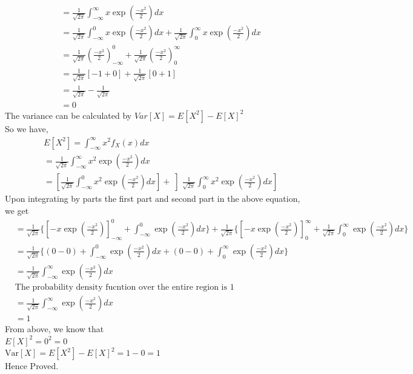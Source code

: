 \documentclass[journal,12pt,twocolumn]{IEEEtran}
\renewcommand\thesection{\arabic{section}}
\begin{document}
\begin{enumerate}[label=\thesection.\arabic*
,ref=\thesection.\theenumi]
\begin{align*}
& =\frac{1}{\sqrt{2\pi}}\int_{-\infty}^{\infty}x\exp\left(\frac{-x^2}{2}\right)dx
\\
& =\frac{1}{\sqrt{2\pi}}\int_{-\infty}^{0} x\exp\left(\frac{-x^2}{2}\right)dx + \frac{1}{\sqrt{2\pi}}\int_{0}^{\infty} x\exp\left(\frac{-x^2}{2}\right)dx
\\
& =\frac{1}{\sqrt{2\pi}}\left(\frac{-x^2}{2}\right)_{-\infty}^{0}+ \frac{1}{\sqrt{2\pi}}\left(\frac{-x^2}{2}\right)_{0}^{\infty}
\\
& =\frac{1}{\sqrt{2\pi}}[-1+0]+\frac{1}{\sqrt{2\pi}}[0+1]
\\
& =\frac{1}{\sqrt{2\pi}}-\frac{1}{\sqrt{2\pi}}
\\
& =0
\end{align*}
The variance can be calculated by
$Var[X]=E[X^2]-E[X]^2$\\
So we have,
\begin{align*}
& E[X^2]=\int_{-\infty}^{\infty}x^2 f_{X}(x)dx
\\ 
& =\frac{1}{\sqrt{2\pi}}\int_{-\infty}^{\infty}x^2\exp\left(\frac{-x^2}{2}\right)dx
\\
& =\left[\frac{1}{\sqrt{2\pi}}\int_{-\infty}^{0}x^2\exp\left(\frac{-x^2}{2}\right)dx\right]+\left]\frac{1}{\sqrt{2\pi}}\int_{0}^{\infty}x^2\exp\left(\frac{-x^2}{2}\right)dx\right]
\end{align*}
Upon integrating by parts the first part and second part in the above equation, we get 
\begin{align*}
&=\frac{1}{\sqrt{2\pi}}\Biggl\{\left[-x\exp\left(\frac{-x^2}{2}\right)\right]_{-\infty}^{0}+\int_{-\infty}^{0}\exp\left(\frac{-x^2}{2}\right)dx\Biggr\}+\frac{1}{\sqrt{2\pi}}\Biggl\{\left[-x\exp\left(\frac{-x^2}{2}\right)\right]_0^{\infty}+
 \frac{1}{\sqrt{2\pi}}\int_{0}^{\infty}\exp\left(\frac{-x^2}{2}\right)dx\Biggr\}
\\ 
&=\frac{1}{\sqrt{2\pi}}\Biggl\{(0-0)+\int_{-\infty}^{0}\exp\left(\frac{-x^2}{2}\right)dx+(0-0)+\int_{0}^{\infty}\exp\left(\frac{-x^2}{2}\right)dx   \Biggr\}
\\
&=\frac{1}{\sqrt{2\pi}}\int_{-\infty}^{\infty}\exp\left(\frac{-x^2}{2}\right)dx
\\
&\text{The probability density fucntion over the entire region is 1}
\\
&=\frac{1}{\sqrt{2\pi}}\int_{-\infty}^{\infty}\exp\left(\frac{-x^2}{2}\right)dx
\\
& =1
\end{align*}
From above, we know that \\
$E[X]^2=0^2=0$\\
$\text{Var}[X]=E[X^2]-E[X]^2=1-0=1$\\
Hence Proved.



\end{enumerate}
\end{document}
